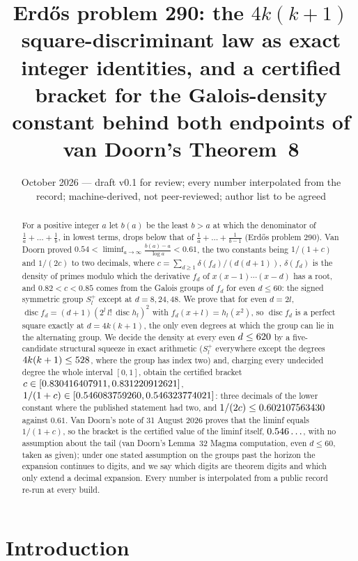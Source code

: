 \documentclass[11pt]{article}
\title{Erd\H{o}s problem 290: the $4k(k+1)$ square-discriminant law as exact integer identities, and a certified bracket for the Galois-density constant behind both endpoints of van Doorn's Theorem~8}
\author{\cmauthor}
\date{October 2026 --- draft v0.1 for review; every number interpolated from the record; machine-derived, not peer-reviewed; author list to be agreed}
\DeclareMathOperator{\disc}{disc}
\newcommand{\lia}{\liminf_{a\to\infty}\frac{b(a)-a}{\log a}}
\newcommand{\Sl}{S_l^{+}}
\begin{document}
\maketitle

\begin{abstract}
For a positive integer $a$ let $b(a)$ be the least $b>a$ at which the denominator of $\frac1a+\dots+\frac1b$, in lowest terms, drops below that of $\frac1a+\dots+\frac1{b-1}$ (Erd\H{o}s problem 290). Van Doorn proved $0.54<\lia<0.61$, the two constants being $1/(1+c)$ and $1/(2c)$ to two decimals, where $c=\sum_{d\ge1}\delta(f_d)/(d(d+1))$, $\delta(f_d)$ is the density of primes modulo which the derivative $f_d$ of $x(x-1)\cdots(x-d)$ has a root, and $0.82<c<0.85$ comes from the Galois groups of $f_d$ for even $d\le60$: the signed symmetric group $\Sl$ except at $d=8,24,48$. We prove that for even $d=2l$, $\disc f_d=(d+1)(2^l\,l!\,\disc h_l)^2$ with $f_d(x+l)=h_l(x^2)$, so $\disc f_d$ is a perfect square exactly at $d=4k(k+1)$, the only even degrees at which the group can lie in the alternating group. We decide the density at every even $d\le620$ by a five-candidate structural squeeze in exact arithmetic ($\Sl$ everywhere except the \ExcCount{} degrees $4k(k+1)\le528$, where the group has index two) and, charging every undecided degree the whole interval $[0,1]$, obtain the certified bracket $c\in[0.830416407911,0.831220912621]$, $1/(1+c)\in[0.546083759260,0.546323774021]$: three decimals of the lower constant where the published statement had two, and $1/(2c)\le0.602107563430$ against $0.61$. Van Doorn's note of 31 August 2026 proves that the liminf equals $1/(1+c)$, so the bracket is the certified value of the liminf itself, $0.546\ldots$, with no assumption about the tail (van Doorn's Lemma~32 Magma computation, even $d\le60$, taken as given); under one stated assumption on the groups past the horizon the expansion continues to \CStarDigits{} digits, and we say which digits are theorem digits and which only extend a decimal expansion. Every number is interpolated from a public record re-run at every build.
\end{abstract}

\section{Introduction}
\end{document}
